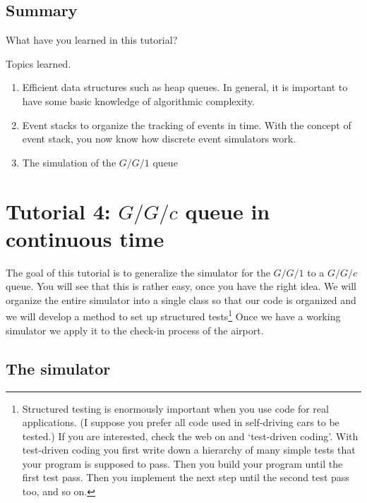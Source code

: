 \subsection{Summary }
\label{sec:summary-}

\begin{exercise}
  What have you learned in this tutorial?
  \begin{solution}
    Topics learned.
    \begin{enumerate}
    \item Efficient data structures such as heap queues. In general, it is important to have some basic knowledge of algorithmic complexity. 
    \item Event stacks to organize the tracking of events in time. With the concept of event stack, you now know how discrete event simulators work. 
    \item The simulation of the $G/G/1$ queue
    \end{enumerate}
  \end{solution}
\end{exercise}


\clearpage


\section{Tutorial 4: $G/G/c$ queue in continuous time}
\label{sec:ggc-continuous-time}

The goal of this tutorial is to  generalize the simulator for the $G/G/1$ to a $G/G/c$ queue. You will see that this is rather easy, once you have the right idea. We will organize the entire simulator into a single class so that our code is organized and we will develop a method to set up structured  tests\footnote{Structured testing is enormously important when you use code for real applications. (I suppose you prefer all code used in self-driving cars to be tested.)  If you are interested, check the web on   and `test-driven coding'. With test-driven coding you first write down a hierarchy of  many simple tests that your program is supposed to pass.  Then you build your program until the first test pass. Then you implement the next step until the second test pass too, and so on.} Once we have a working simulator we apply it to the check-in process of the airport. 



\subsection{The simulator}
\label{sec:simulator}

